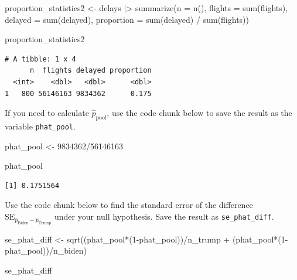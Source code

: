\documentclass[
  letterpaper,
  DIV=11,
  numbers=noendperiod]{scrartcl}
\newenvironment{Shaded}{\begin{snugshade}}{\end{snugshade}}
\newcommand{\AttributeTok}[1]{\textcolor[rgb]{0.40,0.45,0.13}{#1}}
\newcommand{\DecValTok}[1]{\textcolor[rgb]{0.68,0.00,0.00}{#1}}
\newcommand{\FunctionTok}[1]{\textcolor[rgb]{0.28,0.35,0.67}{#1}}
\newcommand{\NormalTok}[1]{\textcolor[rgb]{0.00,0.23,0.31}{#1}}
\newcommand{\OtherTok}[1]{\textcolor[rgb]{0.00,0.23,0.31}{#1}}
\newcommand{\SpecialCharTok}[1]{\textcolor[rgb]{0.37,0.37,0.37}{#1}}
\begin{document}
\begin{Shaded}
\begin{Highlighting}[]
\NormalTok{proportion\_statistics2 }\OtherTok{\textless{}{-}}\NormalTok{ delays }\SpecialCharTok{|\textgreater{}}
  \FunctionTok{summarize}\NormalTok{(}\AttributeTok{n =} \FunctionTok{n}\NormalTok{(), }
            \AttributeTok{flights =} \FunctionTok{sum}\NormalTok{(flights), }
            \AttributeTok{delayed =} \FunctionTok{sum}\NormalTok{(delayed), }
            \AttributeTok{proportion =} \FunctionTok{sum}\NormalTok{(delayed) }\SpecialCharTok{/} \FunctionTok{sum}\NormalTok{(flights))}

\NormalTok{proportion\_statistics2}
\end{Highlighting}
\end{Shaded}

\begin{verbatim}
# A tibble: 1 x 4
      n  flights delayed proportion
  <int>    <dbl>   <dbl>      <dbl>
1   800 56146163 9834362      0.175
\end{verbatim}

If you need to calculate \(\hat{p}_{\text{pool}}\), use the code chunk
below to save the result as the variable \texttt{phat\_pool}.

\begin{Shaded}
\begin{Highlighting}[]
\NormalTok{phat\_pool }\OtherTok{\textless{}{-}} \DecValTok{9834362}\SpecialCharTok{/}\DecValTok{56146163}

\NormalTok{phat\_pool}
\end{Highlighting}
\end{Shaded}

\begin{verbatim}
[1] 0.1751564
\end{verbatim}

Use the code chunk below to find the standard error of the difference
\(\text{SE}_{\hat{p}_{\text{Biden}}-\hat{p}_{\text{Trump}}}\) under your
null hypothesis. Save the result as \texttt{se\_phat\_diff}.

\begin{Shaded}
\begin{Highlighting}[]
\NormalTok{se\_phat\_diff }\OtherTok{\textless{}{-}} \FunctionTok{sqrt}\NormalTok{((phat\_pool}\SpecialCharTok{*}\NormalTok{(}\DecValTok{1}\SpecialCharTok{{-}}\NormalTok{phat\_pool))}\SpecialCharTok{/}\NormalTok{n\_trump }\SpecialCharTok{+}\NormalTok{ (phat\_pool}\SpecialCharTok{*}\NormalTok{(}\DecValTok{1}\SpecialCharTok{{-}}\NormalTok{phat\_pool))}\SpecialCharTok{/}\NormalTok{n\_biden)}

\NormalTok{se\_phat\_diff}
\end{Highlighting}
\end{Shaded}
\end{document}
